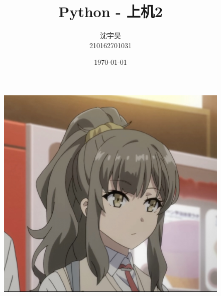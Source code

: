 \documentclass{beamer}
\author{沈宇昊 \\ 210162701031}
\title{Python - 上机2}
\date{\today}
\institute{兰州理工大学}
\begin{document}

  

  \begin{frame}[plain]
    \maketitle
    \begin{figure}[htbp] %
    \centering %
    \includegraphics[width=0.3\textheight,height=0.2\textwidth]{./graph/new- 2.jpg} %
    \end{figure}
  \end{frame}

  
\end{document}
